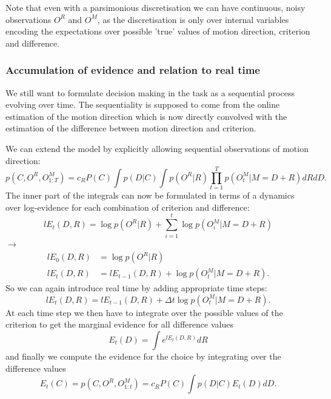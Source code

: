 \documentclass[10pt,a4paper]{article}
\begin{document}
Note that even with a parsimonious discretisation we can have continuous, noisy observations $O^R$ and $O^M$, as the discretisation is only over internal variables encoding the expectations over possible 'true' values of motion direction, criterion and difference.

\subsubsection{Accumulation of evidence and relation to real time}
We still want to formulate decision making in the task as a sequential process evolving over time. The sequentiality is supposed to come from the online estimation of the motion direction which is now directly convolved with the estimation of the difference between motion direction and criterion.

We can extend the model by explicitly allowing sequential observations of motion direction:
\begin{equation}
p(C, O^R, O^M_{1:T}) = c_R P(C) \int p(D | C) \int p(O^R | R) \prod_{t=1}^T p(O^M_t | M = D + R) dR dD.
\end{equation}
The inner part of the integrals can now be formulated in terms of a dynamics over log-evidence for each combination of criterion and difference:
\begin{equation}
lE_t(D, R) = \log p(O^R|R) + \sum_{i=1}^t \log p(O^M_i| M = D + R)
\end{equation}
$\rightarrow$
\begin{align}
lE_0(D, R) &= \log p(O^R|R)\\
lE_t(D, R) &= lE_{t-1}(D, R) + \log p(O^M_t| M = D + R).
\end{align}
So we can again introduce real time by adding appropriate time steps:
\begin{equation}
lE_t(D, R) = lE_{t-1}(D, R) + \Delta t\log p(O^M_t| M = D + R).
\end{equation}
At each time step we then have to integrate over the possible values of the criterion to get the marginal evidence for all difference values
\begin{equation}
E_t(D) = \int e^{lE_t(D, R)} dR
\end{equation}
and finally we compute the evidence for the choice by integrating over the difference values
\begin{equation}
E_t(C) = p(C, O^R, O^M_{1:t}) = c_R P(C) \int p(D | C) E_t(D) dD.
\end{equation}
\end{document}
